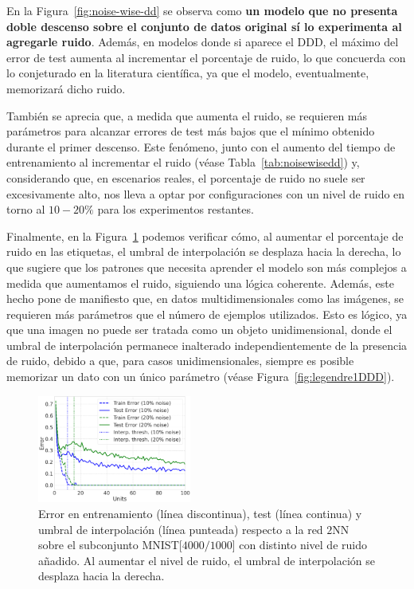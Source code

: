 En la Figura~\ref{fig:noise-wise-dd} se observa como \textbf{un modelo que no presenta doble descenso sobre el conjunto de datos original sí lo experimenta al agregarle ruido}. Además, en modelos donde si aparece el DDD, el máximo del error de test aumenta al incrementar el porcentaje de ruido, lo que concuerda con lo conjeturado en la literatura científica, ya que el modelo, eventualmente, memorizará dicho ruido.

También se aprecia que, a medida que aumenta el ruido, se requieren más parámetros para alcanzar errores de test más bajos que el mínimo obtenido durante el primer descenso. Este fenómeno, junto con el aumento del tiempo de entrenamiento al incrementar el ruido (véase Tabla~\ref{tab:noisewisedd}) y, considerando que, en escenarios reales, el porcentaje de ruido no suele ser excesivamente alto, nos lleva a optar por configuraciones con un nivel de ruido en torno al $10-20\%$ para los experimentos restantes.

Finalmente, en la Figura~\ref{fig:noise-wise-dd3} podemos verificar cómo, al aumentar el porcentaje de ruido en las etiquetas, el umbral de interpolación se desplaza hacia la derecha, lo que sugiere que los patrones que necesita aprender el modelo son más complejos a medida que aumentamos el ruido, siguiendo una lógica coherente. Además, este hecho pone de manifiesto que, en datos multidimensionales como las imágenes, se requieren más parámetros que el número de ejemplos utilizados. Esto es lógico, ya que una imagen no puede ser tratada como un objeto unidimensional, donde el umbral de interpolación permanece inalterado independientemente de la presencia de ruido, debido a que, para casos unidimensionales, siempre es posible memorizar un dato con un único parámetro (véase Figura~\ref{fig:legendre1DDD}).

\begin{figure}[h]
    \centering
    \includegraphics[width=0.45\textwidth]{img/experiments/noise-wise-dd3.png}
    \caption[Umbral de interpolación para el doble descenso con distintos niveles de ruido.]{Error en entrenamiento (línea discontinua), test (línea continua) y umbral de interpolación (línea punteada) respecto a la red $2$NN sobre el subconjunto MNIST[$4000/1000$] con distinto nivel de ruido añadido. Al aumentar el nivel de ruido, el umbral de interpolación se desplaza hacia la derecha.}\label{fig:noise-wise-dd3}
\end{figure}

